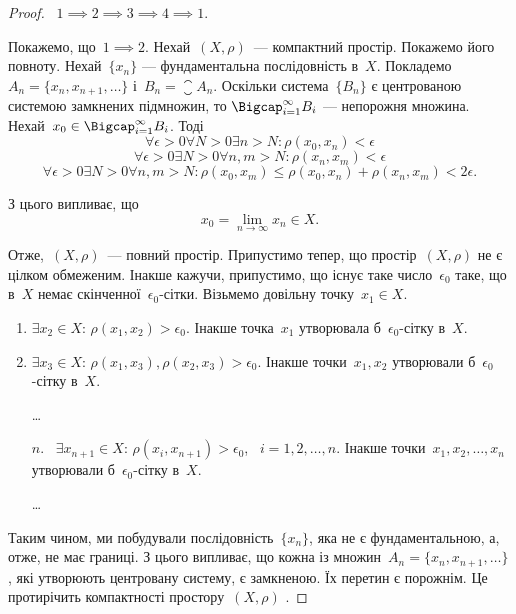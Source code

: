 \begin{proof}~$1 \implies 2 \implies 3 \implies 4 \implies 1$.

Покажемо, що~$1 \implies 2$. Нехай~$(X, \rho)$~--- компактний
простір. Покажемо його повноту. Нехай~$\{x_n\}$ ---
фундаментальна послідовність в~$X$. Покладемо
$A_n = \{x_n, x_{n + 1}, \dots\}$ і~$B_n = \closure A_n$. Оскільки система~$\{B_n\}$ є
центрованою системою замкнених підмножин, то
$\Bigcap_{i = 1}^\infty B_i$ ---
непорожня множина. Нехай~$x_0 \in \Bigcap_{i = 1}^\infty B_i$. Тоді
\begin{equation*}
    \forall \epsilon > 0 \forall N > 0 \exists n > N: \rho(x_0, x_n) < \epsilon
\end{equation*}
\begin{equation*}
    \forall \epsilon > 0 \exists N > 0 \forall n, m > N: \rho(x_n, x_m) < \epsilon
\end{equation*}
\begin{equation*}
    \forall \epsilon > 0 \exists N > 0 \forall n, m > N:
    \rho(x_0, x_m) \le \rho(x_0, x_n) + \rho(x_n, x_m) < 2 \epsilon.
\end{equation*}

З цього випливає, що
\begin{equation*}
    x_0 = \lim_{n \to \infty} x_n \in X.
\end{equation*}

Отже,~$(X, \rho)$~--- повний простір.
Припустимо тепер, що простір~$(X, \rho)$ не є цілком
обмеженим. Інакше кажучи, припустимо, що існує таке
число~$\epsilon_0$ таке, що в~$X$ немає скінченної~$\epsilon_0$-сітки.
Візьмемо довільну точку~$x_1 \in X$.
\begin{enumerate}
    \item $\exists x_2 \in  X$: $\rho(x_1, x_2) > \epsilon_0$.
    Інакше точка~$x_1$ утворювала б~$\epsilon_0$-сітку в~$X$.

    \item $\exists x_3 \in  X$: $\rho(x_1, x_3), \rho(x_2, x_3) > \epsilon_0$.
    Інакше точки~$x_1, x_2$ утворювали б~$\epsilon_0$-сітку в~$X$.

    \dots

    \item[$n$.]~$\exists x_{n + 1} \in  X$: $\rho(x_i, x_{n + 1}) > \epsilon_0$,
   ~$i = 1, 2, \dots, n$.
    Інакше точки~$x_1, x_2, \dots, x_n$ утворювали б~$\epsilon_0$-сітку в~$X$.
    
    \dots
\end{enumerate}

Таким чином, ми побудували послідовність~$\{x_n\}$, яка не є
фундаментальною, а, отже, не має границі. З цього
випливає, що кожна із множин~$A_n = \{x_n, x_{n +1}, \dots\}$, які
утворюють центровану систему, є замкненою. Їх перетин є
порожнім. Це протирічить компактності простору~$(X, \rho)$ .


\end{proof}
